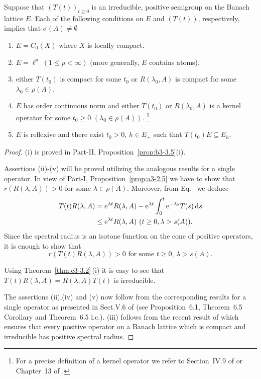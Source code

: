 \begin{theorem}\label{thm:c3-3.7}

Suppose that $(T(t))_{t\geq 0}$ is an irreducible, positive semigroup on the Banach lattice $E$.
Each of the following conditions on $E$ and $(T(t))$, respectively, implies that $\sigma(A) \neq \emptyset$
\begin{enumerate}[\upshape (i)]
	\item
	$E = C_{0}(X)$ where $X$ is locally compact.

	\item 
	$E = \ell^{p}$ $(1 \leq p < \infty)$ (more generally, $E$ contains atoms).

	\item either $T(t_{0})$ is compact for some $t_{0}$ or $R(\lambda_{0},A)$ is compact for some $\lambda_{0} \in \rho(A)$.

	\item 
	$E$ has order continuous norm and either $T(t_{0})$ or $R(\lambda_{0},A)$ is a kernel operator for some $t_{0} \geq 0$ $(\lambda_{0} \in \rho(A))$. 	
	\footnote[1]{For a precise definition of a kernel operator we refer to Section~IV.9 of \textcite{schaefer:1974} or Chapter~13 of \textcite{zaanen:1983}.}

	\item 
	$E$ is reflexive and there exist $t_{0} > 0$, $h \in E_{+}$ such that $T(t_{0})E \subseteq E_{h}$. 
\end{enumerate}
\end{theorem}
\begin{proof}
	(i) is proved in Part-II, Proposition~\ref{prop:b3-3.5}(i).
	
	Assertions (ii)-(v) will be proved utilizing the analogous results for a single operator.
	In view of Part-I, Proposition~\ref{prop:a3-2.5} we have to show that $r(R(\lambda,A)) > 0$ for some $\lambda \in \rho(A)$.
	Moreover, from Eq.~ we deduce
	\begin{align*}
		T(t)R(\lambda,A) & = \eu^{\lambda t}R(\lambda,A) - \eu^{\lambda t}\int_{0}^{t} \eu^{-\lambda s}T(s)\ds \\
		& \leq \eu^{\lambda t}R(\lambda,A) \ (t\geq 0, \lambda>s(A)) .
	\end{align*}
	Since the spectral radius is an isotone function on the cone of positive operators, it is enough to show that
	\begin{equation}\label{eq:c3-3.12}
		r(T(t)R(\lambda,A)) > 0 \text{ for some } t \geq 0,\, \lambda > s(A).
	\end{equation}
	
	Using Theorem~\ref{thm:c3-3.2}\,(i) it is easy to see that $T(t)R(\lambda,A) = R(\lambda,A)T(t)$ is irreducible.
	
	The assertions (ii),(iv) and (v) now follow from the corresponding results for a single operator as presented in Sect.V.6 of \textcite{schaefer:1974} (see Proposition~6.1, Theorem~6.5 Corollary and Theorem~6.5 l.c.).
	(iii) follows from the recent result of \textcite{depagter:1986} which ensures that every positive operator on a Banach lattice which is compact and irreducible has positive spectral radius.
\end{proof}
